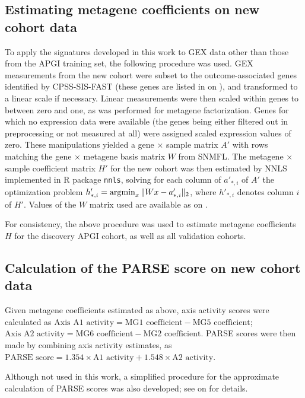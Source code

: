 \documentclass[dissertation.tex]{subfiles}
\begin{document}
\subsection{Estimating metagene coefficients on new cohort data}
To apply the signatures developed in this work to \gls{GEX} data other than those from the \gls{APGI} training set, the following procedure was used.  \Gls{GEX} measurements from the new cohort were subset to the  outcome-associated genes identified by \gls{CPSS}-\gls{SIS}-\gls{FAST} (these genes are listed in  on ), and transformed to a linear scale if necessary.  Linear measurements were then scaled within genes to between zero and one, as was performed for metagene factorization.  Genes for which no expression data were available (the genes being either filtered out in preprocessing or not measured at all) were assigned scaled expression values of zero.  These manipulations yielded a gene $\times$ sample matrix $A'$ with rows matching the gene $\times$ metagene basis matrix $W$ from \gls{SNMFL}.  The metagene $\times$ sample coefficient matrix $H'$ for the new cohort was then estimated by \gls{NNLS} implemented in R package \texttt{nnls}, solving for each column of $a'_{*,i}$ of $A'$ the optimization problem ${h'_{*,i}} = \operatorname*{\arg\!\min}_x \| W x - a'_{*,i} \|_2$, where $h'_{*,i}$ denotes column $i$ of $H'$.  Values of the $W$ matrix used are available as  on .

For consistency, the above procedure was used to estimate metagene coefficients $H$ for the discovery \gls{APGI} cohort, as well as all validation cohorts.

\subsection{Calculation of the \texorpdfstring{\acrshort{PARSE}}{PARSE} score on new cohort data}
Given metagene coefficients estimated as above, axis activity scores were calculated as $\text{Axis A1 activity} = \text{MG1 coefficient} - \text{MG5 coefficient}$; $\text{Axis A2 activity} = \text{MG6 coefficient} - \text{MG2 coefficient}$.  \gls{PARSE} scores were then made by combining axis activity estimates, as $\text{PARSE score} = 1.354 \times \text{A1 activity} + 1.548 \times \text{A2 activity}$.

Although not used in this work, a simplified procedure for the approximate calculation of \gls{PARSE} scores was also developed; see  on  for details.
\end{document}
